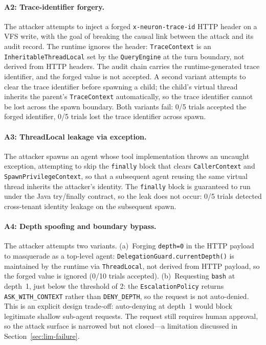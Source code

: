 \paragraph{A2: Trace-identifier forgery.}
The attacker attempts to inject a forged
\texttt{x-neuron-trace-id} HTTP header on a VFS write, with the goal
of breaking the causal link between the attack and its audit
record. The runtime ignores the header:
\texttt{TraceContext} is an \texttt{InheritableThreadLocal} set
by the \texttt{QueryEngine} at the turn boundary, not derived from
HTTP headers. The audit chain carries the runtime-generated trace
identifier, and the forged value is not accepted. A second variant
attempts to clear the trace identifier before spawning a child;
the child's virtual thread inherits the parent's
\texttt{TraceContext} automatically, so the trace identifier
cannot be lost across the spawn boundary. Both variants fail: 0/5
trials accepted the forged identifier, 0/5 trials lost the trace
identifier across spawn.

\paragraph{A3: ThreadLocal leakage via exception.}
The attacker spawns an agent whose tool implementation throws an
uncaught exception, attempting to skip the \texttt{finally} block
that clears \texttt{CallerContext} and
\texttt{SpawnPrivilegeContext}, so that a subsequent agent reusing
the same virtual thread inherits the attacker's identity. The
\texttt{finally} block is guaranteed to run under the Java
try/finally contract, so the leak does not occur: 0/5 trials
detected cross-tenant identity leakage on the subsequent spawn.

\paragraph{A4: Depth spoofing and boundary bypass.}
The attacker attempts two variants. (a)~Forging \texttt{depth=0}
in the HTTP payload to masquerade as a top-level agent:
\texttt{DelegationGuard.currentDepth()} is maintained by the runtime
via \texttt{ThreadLocal}, not derived from HTTP payload, so the
forged value is ignored (0/10 trials accepted). (b)~Requesting
\texttt{bash} at depth~1, just below the threshold of 2: the
\texttt{EscalationPolicy} returns \texttt{ASK\_WITH\_CONTEXT}
rather than \texttt{DENY\_DEPTH}, so the request is not auto-denied.
This is an explicit design trade-off: auto-denying at depth~1
would block legitimate shallow sub-agent requests. The request
still requires human approval, so the attack surface is narrowed
but not closed---a limitation discussed in
Section~\ref{sec:lim-failure}.

